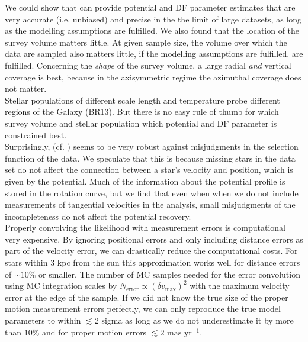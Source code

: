  We could show that \RM{} can provide potential and DF parameter estimates that are very accurate (i.e. unbiased) and precise in the the limit of large datasets, as long as the modelling assumptions are fulfilled. We also found that the location of the survey volume matters little. At given sample size, the volume over which the data are sampled also matters little, if the modelling assumptions are fulfilled.
are fulfilled. Concerning the \emph{shape} of the survey volume, a large radial \emph{and} vertical coverage is best, because in the axisymmetric regime the azimuthal coverage does not matter.
\\Stellar populations of different scale length and temperature probe different regions of the Galaxy (BR13). But there is no easy rule of thumb for which survey volume and stellar population which potential and DF parameter is constrained best.\\
Surprisingly, (cf. \citealt{2013A&ARv..21...61R}) \RM{} seems to be very robust against misjudgments in the selection function of the data. We speculate that this is because missing stars in the data set do not affect the connection between a star's velocity and position, which is given by the potential. Much of the information about the potential profile is stored in the rotation curve, but we find that even when when we do not include measurements of tangential velocities in the analysis, small misjudgments of the incompleteness do not affect the potential recovery.\\

 Properly convolving the likelihood with measurement errors is computational very expensive. By ignoring positional errors and only including distance errors as part of the velocity error, we can drastically reduce the computational costs. For stars within 3 kpc from the sun this approximation works well for distance errors of $\sim 10\%$ or smaller. The number of MC samples needed for the error convolution using MC integration scales by $N_\text{error} \propto (\delta v_\text{max})^2$ with the maximum velocity error at the edge of the sample. If we did not know the true size of the proper motion measurement errors perfectly, we can only reproduce the true model parameters to within $\lesssim 2$ sigma \Wilma{[TO DO: Check???]} as long as we do not underestimate it by more than $10\%$ and for proper motion errors $\lesssim 2 \text{ mas yr}^{-1}$.\\

